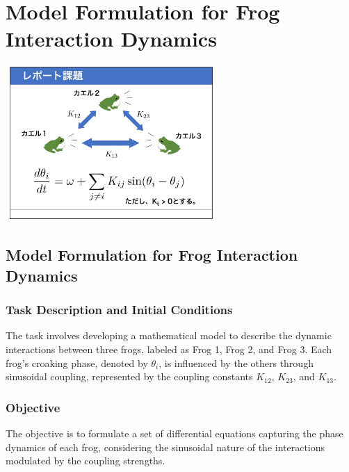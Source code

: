 \documentclass[12pt,a4paper]{article}
\begin{document}
\section{Model Formulation for Frog Interaction Dynamics}

\begin{center}
\includegraphics[width=0.6\textwidth]{materials/task1.jpeg}
\end{center}

\subsection{Model Formulation for Frog Interaction Dynamics}

\subsubsection{Task Description and Initial Conditions}
The task involves developing a mathematical model to describe the dynamic interactions between three frogs, labeled as Frog 1, Frog 2, and Frog 3. Each frog's croaking phase, denoted by $\theta_i$, is influenced by the others through sinusoidal coupling, represented by the coupling constants $K_{12}$, $K_{23}$, and $K_{13}$.

\subsubsection{Objective}
The objective is to formulate a set of differential equations capturing the phase dynamics of each frog, considering the sinusoidal nature of the interactions modulated by the coupling strengths.
\end{document}
